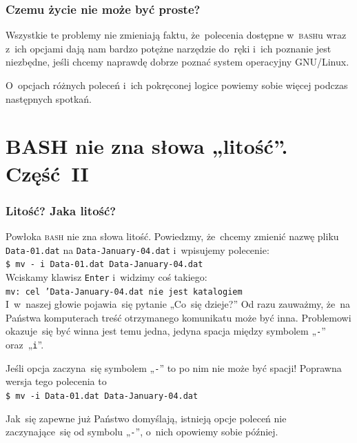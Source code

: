 \documentclass[10pt,t]{beamer}
\begin{document}
\begin{frame}
  \frametitle{Czemu życie nie może być proste?}


  Wszystkie te problemy nie zmieniają faktu, że~polecenia dostępne
  w~\textsc{bash}u wraz z~ich opcjami dają nam bardzo potężne narzędzie
  do~ręki i~ich poznanie jest niezbędne, jeśli chcemy naprawdę dobrze
  poznać system operacyjny GNU/Linux.

  O~opcjach różnych poleceń i~ich pokręconej logice powiemy sobie więcej
  podczas następnych spotkań.

\end{frame}










\section{BASH nie zna słowa „litość”. Część~II}


\begin{frame}
  \frametitle{Litość? Jaka litość?}


  Powłoka \textsc{bash} nie zna słowa litość. Powiedzmy, że~chcemy
  zmienić nazwę pliku \texttt{Data-01.dat} na \texttt{Data-January-04.dat}
  i~wpisujemy polecenie: \\
  \texttt{\$ mv - i Data-01.dat Data-January-04.dat} \\
  Wciskamy klawisz \texttt{Enter} i~widzimy coś takiego: \\
  \texttt{mv: cel 'Data-January-04.dat nie jest katalogiem} \\
  I~w~naszej głowie pojawia~się pytanie „Co~się dzieje?” Od razu zauważmy,
  że~na Państwa komputerach treść otrzymanego komunikatu może być inna.
  Problemowi okazuje~się być winna jest temu jedna, jedyna spacja między
  symbolem „\texttt{-}” oraz~„\texttt{i}”.

  Jeśli opcja zaczyna~się symbolem „\texttt{-}” to po nim
  \alert{nie może być spacji}! Poprawna wersja tego polecenia to \\
  \texttt{\$ mv -i Data-01.dat Data-January-04.dat}

  Jak~się zapewne już Państwo domyślają, istnieją opcje poleceń nie
  zaczynające~się od symbolu „\texttt{-}”, o~nich opowiemy sobie później.

\end{frame}
\end{document}
